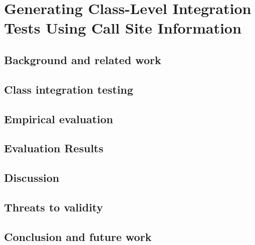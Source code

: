 \chapter{Generating Class-Level Integration Tests Using Call Site Information}
\label{sec:cling:introduction}



\section{Background and related work}
\label{sec:cling:background}



\section{Class integration testing}
\label{sec:cling:approach}



\section{Empirical evaluation}
\label{sec:cling:evaluation}


\section{Evaluation Results}
\label{sec:cling:results}



\section{Discussion}
\label{sec:cling:discussion}



\section{Threats to validity}
\label{sec:cling:threats}



\section{Conclusion and future work}
\label{sec:cling:future-conclusion}
